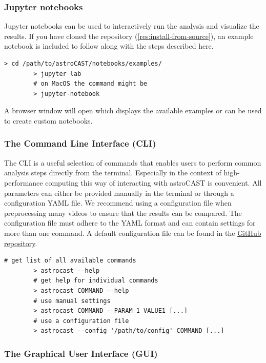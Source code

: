 \documentclass[utf8]{FrontiersinHarvard}
\begin{document}
    \subsubsection{Jupyter notebooks}

    Jupyter notebooks can be used to interactively run the analysis and visualize the results.
    If you have cloned the repository (\ref{res:install-from-source}), an example notebook is included to follow along with the steps described here.

    \begin{lstlisting}[style=bashStyle]
        > cd /path/to/astroCAST/notebooks/examples/
        > jupyter lab
        # on MacOS the command might be
        > jupyter-notebook
    \end{lstlisting}

    A browser window will open which displays the available examples or can be used to create custom notebooks.

    \subsubsection{The Command Line Interface (CLI)}

    The \ac{CLI} is a useful selection of commands that enables users to perform common analysis steps directly from the terminal. Especially in the context of high-performance computing this way of interacting with astroCAST is convenient. All parameters can either be provided manually in the terminal or through a configuration YAML file. We recommend using a configuration file when preprocessing many videos to ensure that the results can be compared. The configuration file must adhere to the YAML format and can contain settings for more than one command. A default configuration file can be found in the \href{https://github.com/janreising/astroCAST/blob/3ad41d03068732419df7fdde9b2a0f449898d4e2/config.yaml}{GitHub repository}.

    \begin{lstlisting}[style=bashStyle]
        # get list of all available commands
        > astrocast --help
        # get help for individual commands
        > astrocast COMMAND --help
        # use manual settings
        > astrocast COMMAND --PARAM-1 VALUE1 [...]
        # use a configuration file
        > astrocast --config '/path/to/config' COMMAND [...]
    \end{lstlisting}

    \subsubsection{The Graphical User Interface (GUI)}
\end{document}
